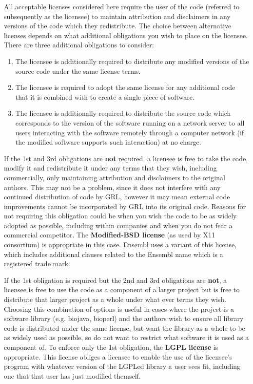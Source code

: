 \documentclass[10pt,a4paper]{article}
\begin{document}
All acceptable licenses considered here require the user of the code (referred to 
subsequently as the licensee) to maintain attribution and disclaimers in any versions of 
the code which they redistribute. The choice between alternative licenses depends on 
what additional obligations you wish to place on the licensee. There are three additional obligations to consider: 

\begin{enumerate}
\item The licensee is additionally required to distribute any modified versions of the 
source code under the same license terms. 
\item The licensee is required to adopt the same license for any additional code that it 
is combined with to create a single piece of software. 
\item The licensee is additionally required to distribute the source code which 
corresponds to the version of the software running on a network server to all 
users interacting with the software remotely through a computer network (if the 
modified software supports such interaction) at no charge. 
\end{enumerate}

If the 1st and 3rd obligations are \textbf{not} required, a licensee is free to take the code, modify 
it and redistribute it under any terms that they wish, including commercially, only 
maintaining attribution and disclaimers to the original authors. This may not be a 
problem, since it does not interfere with any continued distribution of code by GRL, 
however it may mean external code improvements cannot be incorporated by GRL into 
its original code. Reasons for not requiring this obligation could be when you wish the 
code to be as widely adopted as possible, including within companies and when you do 
not fear a commercial competitor. The \textbf{Modified-BSD license} (as used by X11 
consortium) is appropriate in this case. Ensembl uses a variant of this license, which 
includes additional clauses related to the Ensembl name which is a registered trade 
mark. 
 
If the 1st obligation is required but the 2nd and 3rd obligations are \textbf{not}, a licensee is free 
to use the code as a component of a larger project but is free to distribute that larger 
project as a whole under what ever terms they wish. Choosing this combination of 
options is useful in cases where the project is a software library (e.g. biojava, bioperl) 
and the authors wish to ensure all library code is distributed under the same license, 
but want the library as a whole to be as widely used as possible, so do not want to 
restrict what software it is used as a component of. To enforce only the 1st obligation, 
the \textbf{LGPL license} is appropriate. This license obliges a licensee to enable the use of the 
licensee's program with whatever version of the LGPLed library a user sees fit, 
including one that that user has just modified themself. 
\end{document}
